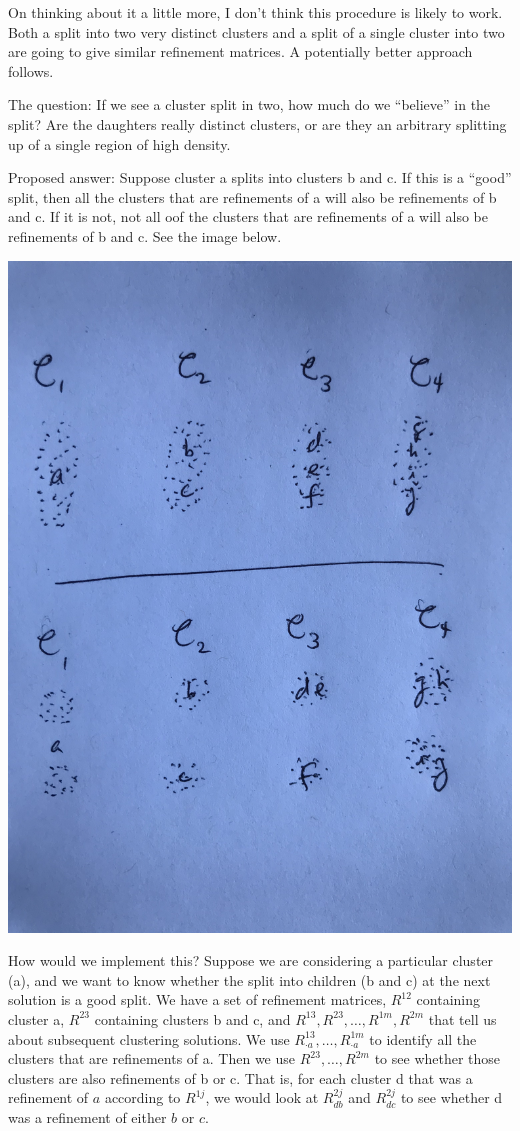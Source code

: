 \documentclass[11pt]{article}
\begin{document}
On thinking about it a little more, I don't think this procedure is likely to work.
Both a split into two very distinct clusters and a split of a single cluster into two are going to give similar refinement matrices.
A potentially better approach follows.

The question: If we see a cluster split in two, how much do we ``believe'' in the split?
Are the daughters really distinct clusters, or are they an arbitrary splitting up of a single region of high density.

Proposed answer: Suppose cluster a splits into clusters b and c.
If this is a ``good'' split, then all the clusters that are refinements of a will also be refinements of b and c.
If it is not, not all oof the clusters that are refinements of a will also be refinements of b and c.
See the image below.

\includegraphics[width=.8\textwidth]{good-bad-split}


How would we implement this?
Suppose we are considering a particular cluster (a), and we want to know whether the split into children (b and c) at the next solution is a good split.
We have a set of refinement matrices, $R^{12}$ containing cluster a, $R^{23}$ containing clusters b and c, and $R^{13}, R^{23},\ldots , R^{1m}, R^{2m}$ that tell us about subsequent clustering solutions.
We use $R^{13}_{\cdot a}, \ldots, R^{1m}_{\cdot a}$ to identify all the clusters that are refinements of a.
Then we use $R^{23}, \ldots, R^{2m}$ to see whether those clusters are also refinements of b or c.
That is, for each cluster d that was a refinement of $a$ according to $R^{1j}$, we would look at $R^{2j}_{d b}$ and $R^{2j}_{d c}$ to see whether d was a refinement of either $b$ or $c$.
\end{document}
